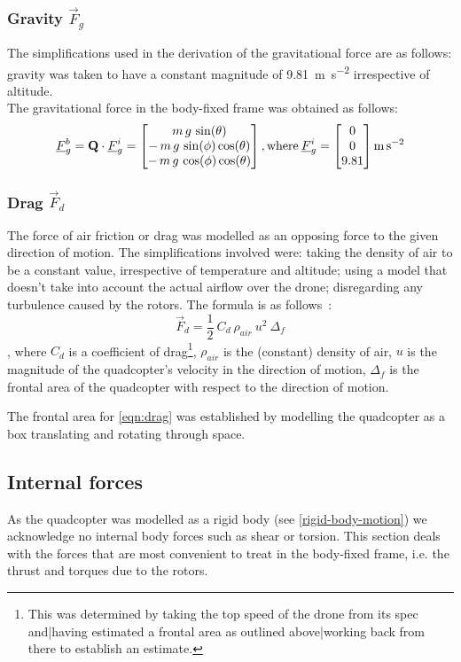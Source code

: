 \subsubsection{Gravity $\vec{F}_g$}
The simplifications used in the derivation of the gravitational force are as follows: gravity was taken to have a constant magnitude of  \SI{9.81}{\metre\per\second\squared} irrespective of altitude.
\\
The gravitational force in the body-fixed frame was obtained as follows:
$$
\underline{F}_g^b = \textbf{Q}\cdot\underline{F}_g^i = \begin{bmatrix}
m\,g\,\sin(\theta)\\-\,m\,g\,\sin(\phi)\cos(\theta)\\-\,m\,g\,\cos(\phi)\cos(\theta)
\end{bmatrix}
\mathrm{, where }\:
\underline{F}_g^i = \begin{bmatrix}
0\\0\\9.81
\end{bmatrix}
\si{\metre\per\second\squared}
$$
\subsubsection{Drag $\vec{F}_d$}
The force of air friction or drag was modelled as an opposing force to the given direction of motion. The simplifications involved were: taking the density of air to be a constant value, irrespective of temperature and altitude; using a model that doesn't take into account the actual airflow over the drone; disregarding any turbulence caused by the rotors. The formula is as follows~:
\begin{equation}
\label{eqn:drag}
\vec{F}_d = \frac{1}{2}\:C_d\:\rho_{air}\:u^2\:\Delta_f
\end{equation}
, where $C_d$ is a coefficient of drag\footnote{This was determined by taking the top speed of the drone from its spec \cite{drone-spec} and|having estimated a frontal area as outlined above|working back from there to establish an estimate. }, $\rho_{air}$ is the (constant) density of air, $u$ is the magnitude of the quadcopter's velocity in the direction of motion, $\Delta_f$ is the frontal area of the quadcopter with respect to the direction of motion.

The frontal area for \cref{eqn:drag} was established by modelling the quadcopter as a box translating and rotating through space.
\subsection{Internal forces}
As the quadcopter was modelled as a rigid body (see \cref{rigid-body-motion}) we acknowledge no internal body forces such as shear or torsion. This section deals with the forces that are most convenient to treat in the body-fixed frame, i.e. the thrust and torques due to the rotors.
